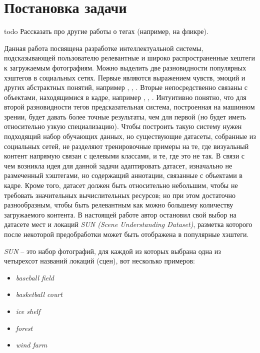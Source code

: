 \section{Постановка задачи}

todo Рассказать про другие работы о тегах (например, на фликре).

\indent
\indent
Данная работа посвящена разработке интеллектуальной системы, 
подсказывающей пользователю релевантные и широко распространенные
хештеги к загружаемым фотографиям.
Можно выделить две разновидности популярных хэштегов в социальных сетях.
Первые являются выражением чувств, эмоций и других абстрактных понятий,
например , , . Вторые непосредственно
связаны с объектами, находящимися в кадре, например  
, , . 
Интуитивно понятно, что для второй разновидности
тегов предсказательная система, построенная на машинном зрении, будет
давать более точные результаты, чем для первой (но будет
иметь относительно узкую специализацию). Чтобы построить такую систему
нужен подходящий набор обучающих данных, но существующие датасеты, 
собранные из социальных сетей, не разделяют тренировочные примеры на те, 
где визуальный контент напрямую связан с целевыми классами, и те, где это не так.
В связи с чем возникла идея для данной задачи 
адаптировать датасет, изначально не размеченный
хэштегами, но содержащий аннотации, связанные с объектами
 в кадре. Кроме того, датасет должен быть относительно небольшим,
чтобы не требовать значительных 
вычислительных ресурсов; но при этом достаточно разнообразным, чтобы 
быть релевантным как можно большему количеству загружаемого контента.
В настоящей работе автор остановил свой выбор на датасете мест и локаций 
 \textit{SUN\cite{sundata} (Scene Understanding Dataset)}, 
 разметка которого после некоторой предобработки может быть отображена в популярные хэштеги.


\indent  
\textit{SUN} -- это набор фотографий, для каждой из которых выбрана одна
 из четырехсот названий локаций (сцен), вот несколько примеров:
  
  
\begin{itemize}
    \item \textit{baseball field}
    \item \textit{basketball court}
    \item \textit{ice shelf}
    \item \textit{forest}
    \item \textit{wind farm}
\end{itemize}


